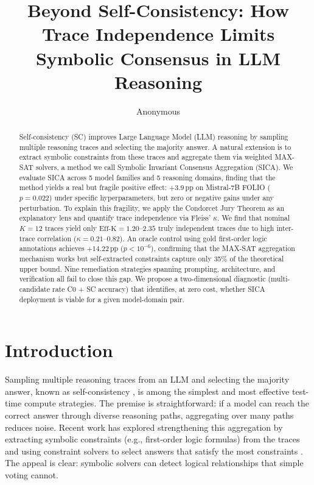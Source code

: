 \documentclass[11pt,a4paper]{article}
\title{Beyond Self-Consistency: How Trace Independence Limits \\Symbolic Consensus in LLM Reasoning}
\author{Anonymous}
\date{}
\newcommand{\effk}{\text{Eff-K}}
\begin{document}
\maketitle

\begin{abstract}
Self-consistency (SC) improves Large Language Model (LLM) reasoning by sampling multiple reasoning traces and selecting the majority answer. A natural extension is to extract symbolic constraints from these traces and aggregate them via weighted MAX-SAT solvers, a method we call Symbolic Invariant Consensus Aggregation (SICA). We evaluate SICA across 5 model families and 5 reasoning domains, finding that the method yields a real but fragile positive effect: $+3.9$\,pp on Mistral-7B FOLIO ($p=0.022$) under specific hyperparameters, but zero or negative gains under any perturbation. To explain this fragility, we apply the Condorcet Jury Theorem as an explanatory lens and quantify trace independence via Fleiss' $\kappa$. We find that nominal $K=12$ traces yield only $\effk = 1.20$--$2.35$ truly independent traces due to high inter-trace correlation ($\kappa = 0.21$--$0.82$). An oracle control using gold first-order logic annotations achieves $+14.22$\,pp ($p < 10^{-6}$), confirming that the MAX-SAT aggregation mechanism works but self-extracted constraints capture only 35\% of the theoretical upper bound. Nine remediation strategies spanning prompting, architecture, and verification all fail to close this gap. We propose a two-dimensional diagnostic (multi-candidate rate C0 + SC accuracy) that identifies, at zero cost, whether SICA deployment is viable for a given model-domain pair.
\end{abstract}


\section{Introduction}
\label{sec:intro}

Sampling multiple reasoning traces from an LLM and selecting the majority answer, known as self-consistency \citep{wang2023selfconsistency}, is among the simplest and most effective test-time compute strategies. The premise is straightforward: if a model can reach the correct answer through diverse reasoning paths, aggregating over many paths reduces noise. Recent work has explored strengthening this aggregation by extracting symbolic constraints (e.g., first-order logic formulas) from the traces and using constraint solvers to select answers that satisfy the most constraints \citep{pan2023logiclm,olausson2023linc}. The appeal is clear: symbolic solvers can detect logical relationships that simple voting cannot.
\end{document}
